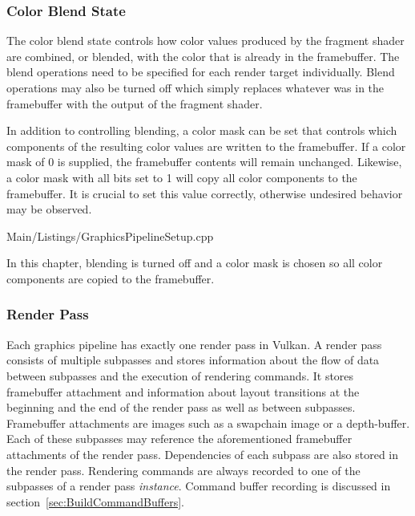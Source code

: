       \subsubsection{Color Blend State}
        The color blend state controls how color values produced by the fragment shader are combined, or blended, with the color that is already in the framebuffer.
        The blend operations need to be specified for each render target individually.
        Blend operations may also be turned off which simply replaces whatever was in the framebuffer with the output of the fragment shader.

        In addition to controlling blending, a color mask can be set that controls which components of the resulting color values are written to the framebuffer.
        If a color mask of 0 is supplied, the framebuffer contents will remain unchanged.
        Likewise, a color mask with all bits set to 1 will copy all color components to the framebuffer.
        It is crucial to set this value correctly, otherwise undesired behavior may be observed.

        
        {Main/Listings/GraphicsPipelineSetup.cpp}

        In this chapter, blending is turned off and a color mask is chosen so all color components are copied to the framebuffer.


      \subsubsection{Render Pass}
        \label{sss:RenderPassSetup}
        Each graphics pipeline has exactly one render pass in Vulkan.
        A render pass consists of multiple subpasses and stores information about the flow of data between subpasses and the execution of rendering commands.
        It stores framebuffer attachment and information about layout transitions at the beginning and the end of the render pass as well as between subpasses.
        Framebuffer attachments are images such as a swapchain image or a depth-buffer.
        Each of these subpasses may reference the aforementioned framebuffer attachments of the render pass.
        Dependencies of each subpass are also stored in the render pass.
        Rendering commands are always recorded to one of the subpasses of a render pass \textit{instance}.
        Command buffer recording is discussed in section~\ref{sec:BuildCommandBuffers}.

